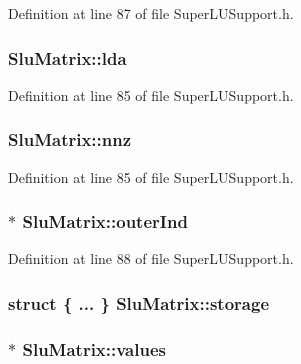 Definition at line 87 of file Super\-L\-U\-Support.\-h.

\hypertarget{struct_slu_matrix_aafad0ef506998d9eb30fa0277dd08062}{
\subsubsection[{lda}]{ Slu\-Matrix\-::lda}}\label{struct_slu_matrix_aafad0ef506998d9eb30fa0277dd08062}


Definition at line 85 of file Super\-L\-U\-Support.\-h.

\hypertarget{struct_slu_matrix_a8c6e4763eb741f70ff9a9e8a134cdad7}{
\subsubsection[{nnz}]{ Slu\-Matrix\-::nnz}}\label{struct_slu_matrix_a8c6e4763eb741f70ff9a9e8a134cdad7}


Definition at line 85 of file Super\-L\-U\-Support.\-h.

\hypertarget{struct_slu_matrix_a167728f62bf61278d35b56e3f7daf1fb}{
\subsubsection[{outer\-Ind}]{$\ast$ Slu\-Matrix\-::outer\-Ind}}\label{struct_slu_matrix_a167728f62bf61278d35b56e3f7daf1fb}


Definition at line 88 of file Super\-L\-U\-Support.\-h.

\hypertarget{struct_slu_matrix_a91687a51dc449ea194d400e8ae469645}{
\subsubsection[{storage}]{\setlength{\rightskip}{0pt plus 5cm}struct \{ ... \}   Slu\-Matrix\-::storage}}\label{struct_slu_matrix_a91687a51dc449ea194d400e8ae469645}
\hypertarget{struct_slu_matrix_a37224218289d334e09951e155eb84056}{
\subsubsection[{values}]{$\ast$ Slu\-Matrix\-::values}}\label{struct_slu_matrix_a37224218289d334e09951e155eb84056}


